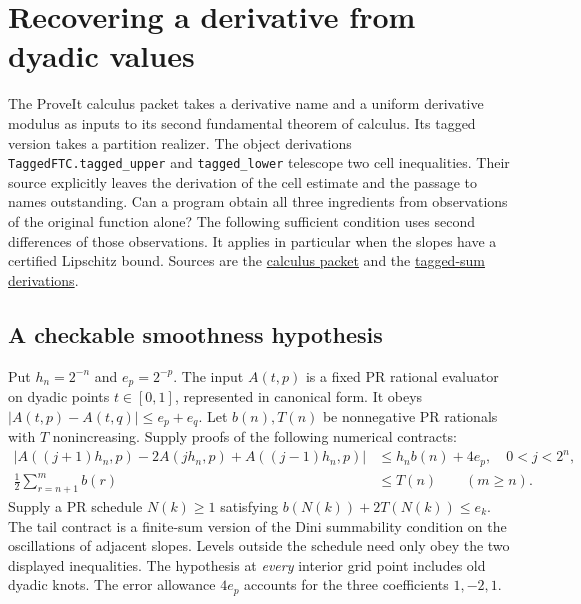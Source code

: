 \section{Recovering a derivative from dyadic values}
\label{sec:dyadicapplication}

The ProveIt calculus packet takes a derivative name and a uniform derivative modulus as inputs to its second fundamental theorem of calculus. Its tagged version takes a partition realizer. The object derivations \texttt{TaggedFTC.tagged\_upper} and \texttt{tagged\_lower} telescope two cell inequalities. Their source explicitly leaves the derivation of the cell estimate and the passage to names outstanding. Can a program obtain all three ingredients from observations of the original function alone? The following sufficient condition uses second differences of those observations. It applies in particular when the slopes have a certified Lipschitz bound. Sources are the
\href{https://github.com/VladimirReshetnikov/ProveIt/blob/b2341af5370cd8a43f72ebb2341c0d7d7395b634/Logic/PrimitiveRecursiveArithmetic/docs/proofs/analysis/calculus_ipra/README.md}{calculus packet} and the
\href{https://github.com/VladimirReshetnikov/ProveIt/blob/b2341af5370cd8a43f72ebb2341c0d7d7395b634/Logic/PrimitiveRecursiveArithmetic/Derivations/Lean/IPRADerivations/Analysis/TaggedFTC.lean}{tagged-sum derivations}.

\subsection{A checkable smoothness hypothesis}

Put $h_n=2^{-n}$ and $e_p=2^{-p}$. The input $A(t,p)$ is a fixed PR rational evaluator on dyadic points $t\in[0,1]$, represented in canonical form. It obeys
$|A(t,p)-A(t,q)|\le e_p+e_q$. Let $b(n),T(n)$ be nonnegative PR rationals with $T$ nonincreasing. Supply proofs of the following numerical contracts:
\begin{align}
 |A((j+1)h_n,p)-2A(jh_n,p)+A((j-1)h_n,p)|
       &\le h_n b(n)+4e_p,
       \quad 0<j<2^n, \label{eq:dd-grid}\\
 \tfrac12\sum_{r=n+1}^m b(r)&\le T(n)
       \qquad (m\ge n). \label{eq:dd-tail}
\end{align}
Supply a PR schedule $N(k)\ge1$ satisfying $b(N(k))+2T(N(k))\le e_k$.
The tail contract is a finite-sum version of the Dini summability condition on the oscillations of adjacent slopes. Levels outside the schedule need only obey the two displayed inequalities. The hypothesis at \emph{every} interior grid point includes old dyadic knots. The error allowance $4e_p$ accounts for the three coefficients $1,-2,1$.

